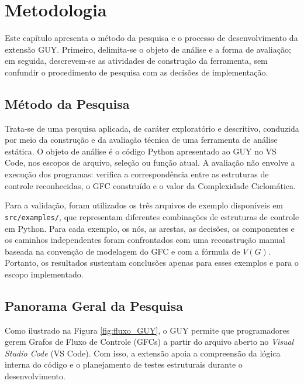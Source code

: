 \chapter{Metodologia}
\label{cap:03}


Este capítulo apresenta o método da pesquisa e o processo de desenvolvimento da extensão GUY. Primeiro, delimita-se o objeto de análise e a forma de avaliação; em seguida, descrevem-se as atividades de construção da ferramenta, sem confundir o procedimento de pesquisa com as decisões de implementação.

\section{Método da Pesquisa}
\label{sec:metodo_pesquisa}

Trata-se de uma pesquisa aplicada, de caráter exploratório e descritivo, conduzida por meio da construção e da avaliação técnica de uma ferramenta de análise estática. O objeto de análise é o código Python apresentado ao GUY no VS Code, nos escopos de arquivo, seleção ou função atual. A avaliação não envolve a execução dos programas: verifica a correspondência entre as estruturas de controle reconhecidas, o GFC construído e o valor da Complexidade Ciclomática.

Para a validação, foram utilizados os três arquivos de exemplo disponíveis em \texttt{src/examples/}, que representam diferentes combinações de estruturas de controle em Python. Para cada exemplo, os nós, as arestas, as decisões, os componentes e os caminhos independentes foram confrontados com uma reconstrução manual baseada na convenção de modelagem do GFC e com a fórmula de $V(G)$. Portanto, os resultados sustentam conclusões apenas para esses exemplos e para o escopo implementado.

\section{Panorama Geral da Pesquisa}
Como ilustrado na Figura \ref{fig:fluxo_GUY}, o GUY permite que programadores gerem Grafos de Fluxo de Controle (GFCs) a partir do arquivo aberto no \textit{Visual Studio Code} (VS Code). Com isso, a extensão apoia a compreensão da lógica interna do código e o planejamento de testes estruturais durante o desenvolvimento.


